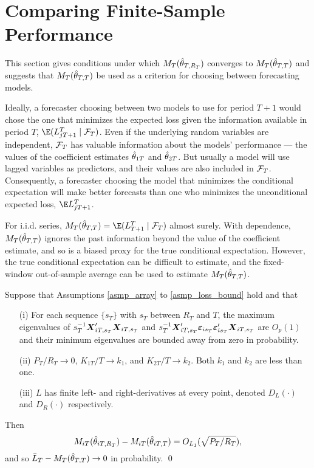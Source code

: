 \documentclass[11pt]{article} \def\baselinestretch{1.08}
\newcommand{\pp}[1]{#1} \newcommand{\intro}[1]{#1}
\begin{document}
\section{Comparing Finite-Sample Performance} \label{sec_perf} 
This section gives conditions under which $M_{{}T}({\hat \theta_{{}T,{R_T}}})$ converges to
$M_{{}T}({\hat \theta_{{}T,{T}}})$ and suggests that $M_{{}T}({\hat \theta_{{}T,{T}}})$ be used as a criterion for
choosing between forecasting models.

\pp{Ideally, a forecaster choosing between two models to use for period
  $T+1$ would chose the one that minimizes the expected loss given the
  information available in period $T$, $\ct{j}$.}  Even if the
underlying random variables are independent, $\mathcal F_{T}$ has valuable
information about the models' performance --- the values of the
coefficient estimates $\hat \theta_{{1}{T}}$ and $\hat \theta_{{2}{T}}$. But usually a model
will use lagged variables as predictors, and their values are also
included in $\mathcal F_{T}$. Consequently, a
forecaster choosing the model that minimizes the conditional
expectation will make better forecasts than one who minimizes the
unconditional expected loss, $\E \ff{j}{T+1}$.

For i.i.d. series, $\mmtT{} = \ct{}$ almost surely.  With dependence,
$M_{{}T}({\hat \theta_{{}T,{T}}})$ ignores the past information beyond the value of the
coefficient estimate, and so is a biased proxy for the true
conditional expectation.  However, the true conditional expectation
can be difficult to estimate, and the fixed-window out-of-sample
average can be used to estimate $M_{{}T}({\hat \theta_{{}T,{T}}})$.

\begin{lem} \label{lem_muR}
  Suppose that Assumptions \ref{asmp_array} to \ref{asmp_loss_bound}
  hold and that 
  \begin{itemize}
  \item[(i)] For each sequence $\{s_T\}$ with $s_T$ between $R_T$ and $T$, the
  maximum eigenvalues of $s_T^{-1} \boldsymbol{X}_{{i}T,{s_T}}'\boldsymbol{X}_{{i}T,{s_T}}$ and
  $s_T^{-1} \boldsymbol{X}_{{i}T,{s_T}}'\boldsymbol{\varepsilon}_{{i}{s_T}}\boldsymbol{\varepsilon}_{{i}{s_T}}'\boldsymbol{X}_{{i}T,{s_T}}$ are
  $O_p(1)$ and their minimum eigenvalues are bounded away from zero in
  probability.
  \item[(ii)] $P_T/R_T \to 0$, $K_{1T}/T \to k_1$, and $K_{2T}/T \to
  k_2$.  Both $k_1$ and $k_2$ are less than one.
  \item[(iii)] $L$ has finite left- and right-derivatives at every
  point, denoted $D_L(\cdot)$ and $D_R(\cdot)$ respectively.
  \end{itemize}
  Then
  \[
  M_{{i}T}({\hat \theta_{{i}T,{R_T}}}) - M_{{i}T}({\hat \theta_{{i}T,{T}}}) = O_{L_1}(\sqrt{P_T/R_T}),
  \]
  and so $\bar L_{{}T} - M_{{}T}({\hat \theta_{{}T,{T}}}) \to 0$ in probability.
  \qed
\end{lem}
\end{document}
